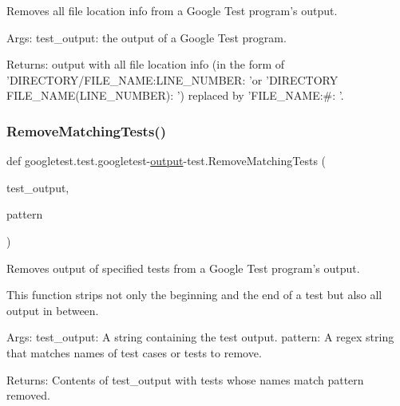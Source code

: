 \begin{DoxyVerb}Removes all file location info from a Google Test program's output.

Args:
     test_output:  the output of a Google Test program.

Returns:
     output with all file location info (in the form of
     'DIRECTORY/FILE_NAME:LINE_NUMBER: 'or
     'DIRECTORY\\FILE_NAME(LINE_NUMBER): ') replaced by
     'FILE_NAME:#: '.
\end{DoxyVerb}
 \mbox{\label{namespacegoogletest_1_1test_1_1googletest-output-test_ae12b8b8e5cc6efd5dd1452923b347cb7}} 
\subsubsection{\texorpdfstring{RemoveMatchingTests()}{RemoveMatchingTests()}}
{\footnotesize\ttfamily def googletest.\+test.\+googletest-\/\mbox{\hyperlink{namespacegoogletest_1_1test_1_1googletest-output-test_a6773c2217ae4694b4db5610620562437}{output}}-\/test.\+Remove\+Matching\+Tests (\begin{DoxyParamCaption}\item[{}]{test\+\_\+output,  }\item[{}]{pattern }\end{DoxyParamCaption})}

\begin{DoxyVerb}Removes output of specified tests from a Google Test program's output.

This function strips not only the beginning and the end of a test but also
all output in between.

Args:
  test_output:       A string containing the test output.
  pattern:           A regex string that matches names of test cases or
                     tests to remove.

Returns:
  Contents of test_output with tests whose names match pattern removed.
\end{DoxyVerb}
 \mbox{\label{namespacegoogletest_1_1test_1_1googletest-output-test_aa1969514763d6a962445f53ecfb41abf}} 
